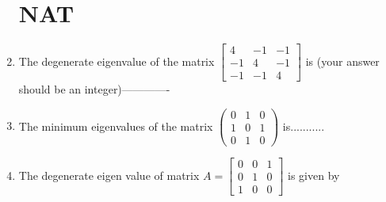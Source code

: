 \begin{enumerate}
\section{NAT}              
  \item The degenerate eigenvalue of the matrix $\left[\begin{array}{ccc}4 & -1 & -1 \\ -1 & 4 & -1 \\ -1 & -1 & 4\end{array}\right]$ is (your answer should be an integer)-------------      
\item  The minimum eigenvalues of the matrix $\left(\begin{array}{lll}0 & 1 & 0 \\ 1 & 0 & 1 \\ 0 & 1 & 0\end{array}\right)$ is...........               
  \item The degenerate eigen value of matrix $A=\left[\begin{array}{lll}0 & 0 & 1 \\ 0 & 1 & 0 \\ 1 & 0 & 0\end{array}\right]$ is given by
                
                
                
\end{enumerate}
